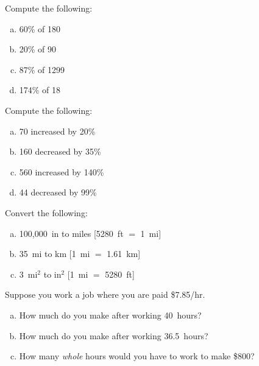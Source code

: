 \documentclass[11pt,letterpaper]{article}
\begin{document}

 Compute the following:
\begin{enumerate}[(a)]
\item 60\% of 180
\item 20\% of 90
\item 87\% of 1299
\item 174\% of 18
\end{enumerate}





\newpage





 Compute the following:
\begin{enumerate}[(a)]
\item 70 increased by 20\%
\item 160 decreased by 35\%
\item 560 increased by 140\%
\item 44 decreased by 99\%
\end{enumerate}





\newpage





 Convert the following:
\begin{enumerate}[(a)]
\item 100,000~in to miles [5280~ft $=$ 1~mi]
\item 35~mi to km [1~mi $=$ 1.61~km]
\item 3~mi$^2$ to in$^2$ [1~mi $=$ 5280~ft]
\end{enumerate}





\newpage





 Suppose you work a job where you are paid \$7.85/hr. 
\begin{enumerate}[(a)]
\item How much do you make after working 40~hours?
\item How much do you make after working 36.5~hours?
\item How many \textit{whole} hours would you have to work to make \$800?
\end{enumerate}
\end{document}
